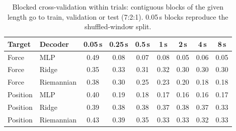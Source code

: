 \begin{table}[t]
\centering
\caption{Blocked cross-validation within trials: contiguous blocks of the given length go to train, validation or test (7:2:1). 0.05\,s blocks reproduce the shuffled-window split.}
\label{tab:blocks}
\footnotesize
\setlength{\tabcolsep}{3pt}
\begin{tabular}{llccccccc}
\toprule
Target & Decoder & 0.05\,s & 0.25\,s & 0.5\,s & 1\,s & 2\,s & 4\,s & 8\,s \\
\midrule
Force & MLP & 0.49 & 0.08 & 0.07 & 0.08 & 0.05 & 0.06 & 0.05 \\
Force & Ridge & 0.35 & 0.33 & 0.31 & 0.32 & 0.30 & 0.30 & 0.30 \\
Force & Riemannian & 0.38 & 0.30 & 0.25 & 0.23 & 0.20 & 0.18 & 0.18 \\
Position & MLP & 0.40 & 0.19 & 0.18 & 0.17 & 0.16 & 0.16 & 0.17 \\
Position & Ridge & 0.39 & 0.38 & 0.38 & 0.37 & 0.38 & 0.37 & 0.33 \\
Position & Riemannian & 0.43 & 0.39 & 0.35 & 0.33 & 0.33 & 0.32 & 0.33 \\
\bottomrule
\end{tabular}
\end{table}
